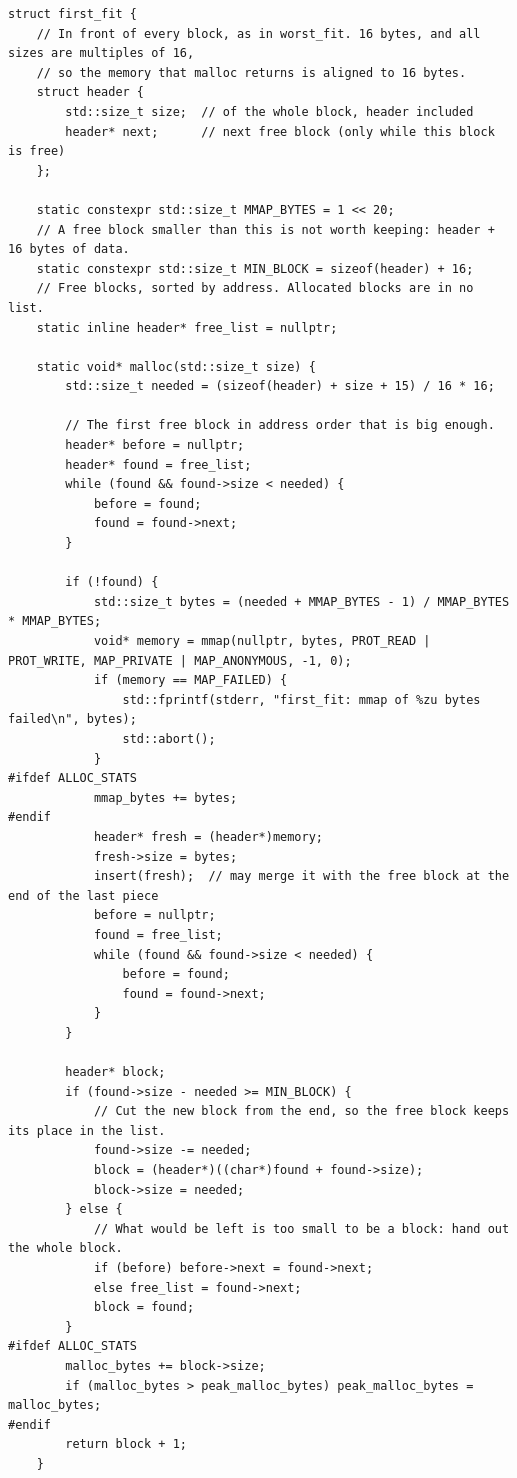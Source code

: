 \documentclass[11pt,a4paper]{article}
\begin{document}
\begin{lstlisting}[caption={First fit allocator: \texttt{malloc}, \texttt{free} και \texttt{insert} με coalescing (\texttt{allocators/first\_fit\_allocator.hpp}).}, label={lst:firstfit}]
struct first_fit {
    // In front of every block, as in worst_fit. 16 bytes, and all sizes are multiples of 16,
    // so the memory that malloc returns is aligned to 16 bytes.
    struct header {
        std::size_t size;  // of the whole block, header included
        header* next;      // next free block (only while this block is free)
    };

    static constexpr std::size_t MMAP_BYTES = 1 << 20;
    // A free block smaller than this is not worth keeping: header + 16 bytes of data.
    static constexpr std::size_t MIN_BLOCK = sizeof(header) + 16;
    // Free blocks, sorted by address. Allocated blocks are in no list.
    static inline header* free_list = nullptr;

    static void* malloc(std::size_t size) {
        std::size_t needed = (sizeof(header) + size + 15) / 16 * 16;

        // The first free block in address order that is big enough.
        header* before = nullptr;
        header* found = free_list;
        while (found && found->size < needed) {
            before = found;
            found = found->next;
        }

        if (!found) {
            std::size_t bytes = (needed + MMAP_BYTES - 1) / MMAP_BYTES * MMAP_BYTES;
            void* memory = mmap(nullptr, bytes, PROT_READ | PROT_WRITE, MAP_PRIVATE | MAP_ANONYMOUS, -1, 0);
            if (memory == MAP_FAILED) {
                std::fprintf(stderr, "first_fit: mmap of %zu bytes failed\n", bytes);
                std::abort();
            }
#ifdef ALLOC_STATS
            mmap_bytes += bytes;
#endif
            header* fresh = (header*)memory;
            fresh->size = bytes;
            insert(fresh);  // may merge it with the free block at the end of the last piece
            before = nullptr;
            found = free_list;
            while (found && found->size < needed) {
                before = found;
                found = found->next;
            }
        }

        header* block;
        if (found->size - needed >= MIN_BLOCK) {
            // Cut the new block from the end, so the free block keeps its place in the list.
            found->size -= needed;
            block = (header*)((char*)found + found->size);
            block->size = needed;
        } else {
            // What would be left is too small to be a block: hand out the whole block.
            if (before) before->next = found->next;
            else free_list = found->next;
            block = found;
        }
#ifdef ALLOC_STATS
        malloc_bytes += block->size;
        if (malloc_bytes > peak_malloc_bytes) peak_malloc_bytes = malloc_bytes;
#endif
        return block + 1;
    }


\end{lstlisting}
\end{document}
